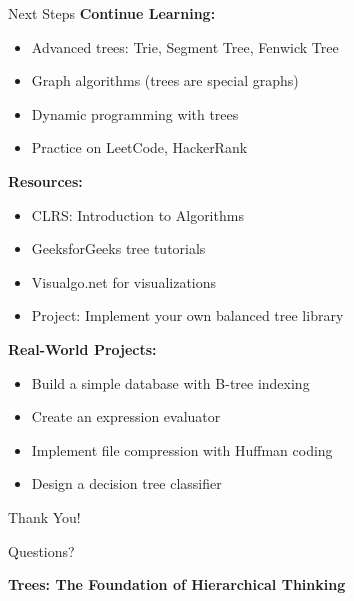 \documentclass[aspectratio=169]{beamer}
\begin{document}
\begin{frame}{Next Steps}
  \textbf{Continue Learning:}
  \begin{itemize}
    \item Advanced trees: Trie, Segment Tree, Fenwick Tree
    \item Graph algorithms (trees are special graphs)
    \item Dynamic programming with trees
    \item Practice on LeetCode, HackerRank
  \end{itemize}

  \vspace{0.3cm}
  \textbf{Resources:}
  \begin{itemize}
    \item CLRS: Introduction to Algorithms
    \item GeeksforGeeks tree tutorials
    \item Visualgo.net for visualizations
    \item Project: Implement your own balanced tree library
  \end{itemize}

  \vspace{0.3cm}
  \textbf{Real-World Projects:}
  \begin{itemize}
    \item Build a simple database with B-tree indexing
    \item Create an expression evaluator
    \item Implement file compression with Huffman coding
    \item Design a decision tree classifier
  \end{itemize}
\end{frame}

\begin{frame}
  \begin{center}
    {\Huge Thank You!}

    \vspace{1cm}
    {\Large Questions?}

    \vspace{1cm}
    \textbf{Trees: The Foundation of Hierarchical Thinking}
  \end{center}
\end{frame}
\end{document}
